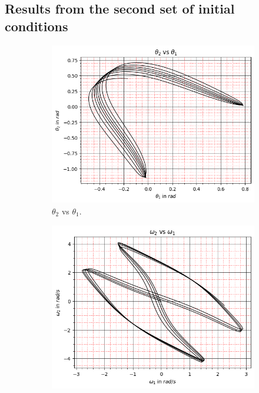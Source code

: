 \subsection{Results from the second set of initial conditions}
\begin{figure}[H]
    \centering
    \begin{subfigure}[b]{0.49\textwidth}
        \centering
        \includegraphics[width=\textwidth]{figures/initial-conditions-b/theta_2 vs theta_1.png}
        \caption{$\theta_2$ vs $\theta_1$.}
        \label{fig:3a}
    \end{subfigure}
    \hfill
    \begin{subfigure}[b]{0.49\textwidth}
        \centering
        \includegraphics[width=\textwidth]{figures/initial-conditions-b/omega_2 vs omega_1.png}

\end{subfigure}
\end{figure}
